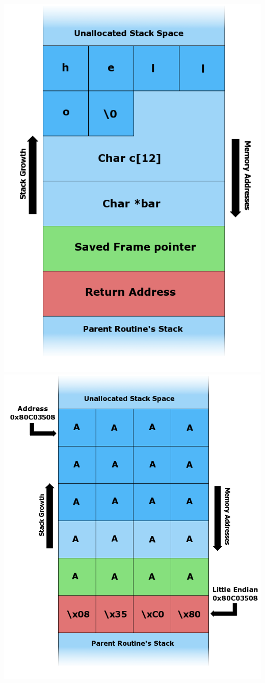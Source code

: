 \documentclass[usenames,dvipsnames]{beamer}
\begin{document}
\begin{frame}
\includegraphics[scale=0.16]{Stack_Overflow_3.png}
\includegraphics[scale=0.16]{Stack_Overflow_4.png}


\end{frame}
\end{document}
